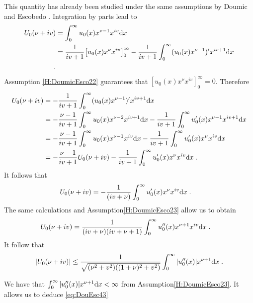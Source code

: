 \documentclass[11pt]{amsart}
\begin{document}
This quantity has already been studied under the same assumptions by Doumic and Escobedo \cite{doumic2016time}. Integration by parts lead to 
    \begin{align*}
        U_0(\nu + i v) 
        &= \int_0^\infty u_0(x) x^{\nu-1}x^{i v}\mathrm dx \\
        &= \frac{1}{iv + 1} \big[ u_0(x) x^{\nu} x^{i v} \big]_0^\infty - \frac{1}{iv + 1} \int_0^\infty (u_0(x) x^{\nu-1})' x^{i v+1}\mathrm dx \\
        \; .
    \end{align*}
Assumption \eqref{H:DoumicEsco22} guarantees that $[ u_0(x) x^{\nu} x^{i v} ]_0^\infty = 0$. Therefore
    \begin{align*}
        U_0(\nu + i v) 
        &= - \frac{1}{iv + 1} \int_0^\infty (u_0(x) x^{\nu-1})' x^{i v+1}\mathrm dx \\
        &= - \frac{\nu - 1}{iv + 1} \int_0^\infty u_0(x) x^{\nu-2} x^{i v + 1}\mathrm dx  - \frac{1}{iv + 1} \int_0^\infty u_0'(x) x^{\nu-1} x^{i v + 1}\mathrm dx \\
        &= - \frac{\nu - 1}{iv + 1} \int_0^\infty u_0(x) x^{\nu-1} x^{i v}\mathrm dx  - \frac{1}{iv + 1} \int_0^\infty u_0'(x) x^{\nu} x^{i v}\mathrm dx \\
        &= - \frac{\nu - 1}{iv + 1} U_0(\nu + i v)   - \frac{1}{iv + 1} \int_0^\infty u_0'(x) x^{\nu} x^{i v}\mathrm dx
        \; .
    \end{align*}
It follows that 
    \begin{align*}
        U_0(\nu + i v)
        &= - \frac{1}{(iv + \nu)}\int_0^\infty u_0'(x) x^{\nu} x^{i v}\mathrm dx
        \; .
    \end{align*}
The same calculations and Assumption\eqref{H:DoumicEsco23} allow us to obtain 
    \begin{align*}
        U_0(\nu + i v)
        &=  \frac{1}{(iv + \nu)(iv + \nu + 1)}\int_0^\infty u_0''(x) x^{\nu + 1} x^{i v}\mathrm dx
        \; .
    \end{align*}
It follow that 
    \begin{equation*}
        |U_0(\nu + i v)| \leq \frac{1}{\sqrt{(\nu^2 + v^2)((1+\nu)^2 + v^2)}} \int_0^\infty |u_0''(x)| x^{\nu + 1} \mathrm dx
        \; .
    \end{equation*}

We have that $\int_0^\infty |u_0''(x)| x^{\nu + 1} \mathrm dx < \infty$ from Assumption\eqref{H:DoumicEsco23}. It allows us to deduce \eqref{eq:DouEsc43} \\
\end{document}
